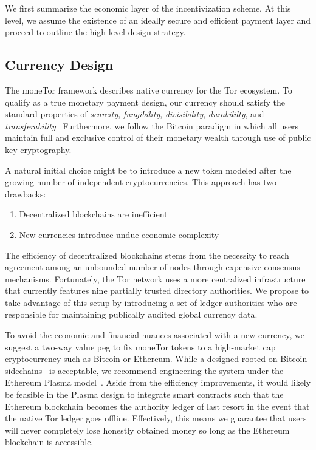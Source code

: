 We first summarize the economic layer of the incentivization scheme. At this
level, we assume the existence of an ideally secure and efficient payment layer
and proceed to outline the high-level design strategy.

\subsection{Currency Design}

The moneTor framework describes native currency for the Tor ecosystem. To
qualify as a true monetary payment design, our currency should satisfy the
standard properties of \textit{scarcity}, \textit{fungibility},
\textit{divisibility}, \textit{durabililty}, and
\textit{transferability}~\cite[p. 3]{crump2011phenomenon} Furthermore, we follow
the Bitcoin paradigm in which all users maintain full and exclusive control of
their monetary wealth through use of public key cryptography.

A natural initial choice might be to introduce a new token modeled after the
growing number of independent cryptocurrencies. This approach has two drawbacks:

\begin{enumerate}
\item Decentralized blockchains are inefficient
\item New currencies introduce undue economic complexity
\end{enumerate}

The efficiency of decentralized blockchains stems from the necessity to reach
agreement among an unbounded number of nodes through expensive consensus
mechanisms. Fortunately, the Tor network uses a more centralized infrastructure
that currently features nine partially trusted directory authorities. We propose
to take advantage of this setup by introducing a set of ledger authorities who are
responsible for maintaining publically audited global currency data.

To avoid the economic and financial nuances associated with a new currency, we
suggest a two-way value peg to fix moneTor tokens to a high-market cap
cryptocurrency such as Bitcoin or Ethereum. While a designed rooted on Bitcoin
sidechains~\cite{back2014enabling} is acceptable, we recommend engineering the
system under the Ethereum Plasma model~\cite{poon2017plasma}. Aside from the
efficiency improvements, it would likely be feasible in the Plasma design to
integrate smart contracts such that the Ethereum blockchain becomes the
authority ledger of last resort in the event that the native Tor ledger goes
offline. Effectively, this means we guarantee that users will never completely
lose honestly obtained money so long as the Ethereum blockchain is accessible.

